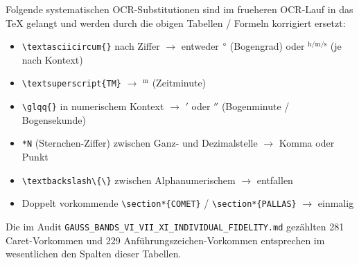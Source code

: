 \documentclass[11pt,a4paper]{article}
\begin{document}
Folgende systematischen OCR-Substitutionen sind im frueheren OCR-Lauf in das TeX gelangt
und werden durch die obigen Tabellen / Formeln korrigiert ersetzt:
\begin{itemize}\itemsep0pt
\item \verb|\textasciicircum{}| nach Ziffer $\to$ entweder $\degree$ (Bogengrad) oder $^{\mathrm{h/m/s}}$ (je nach Kontext)
\item \verb|\textsuperscript{TM}|              $\to$ $^{\mathrm{m}}$ (Zeitminute)
\item \verb|\glqq{}| in numerischem Kontext    $\to$ $'$ oder $''$ (Bogenminute / Bogensekunde)
\item \verb|*N| (Sternchen-Ziffer) zwischen Ganz- und Dezimalstelle $\to$ Komma oder Punkt
\item \verb|\textbackslash\{\}| zwischen Alphanumerischem $\to$ entfallen
\item Doppelt vorkommende \verb|\section*{COMET}| / \verb|\section*{PALLAS}| $\to$ einmalig
\end{itemize}

\noindent
Die im Audit \texttt{GAUSS\_BANDS\_VI\_VII\_XI\_INDIVIDUAL\_FIDELITY.md} gez\"ahlten
281 Caret-Vorkommen und 229 Anf\"uhrungszeichen-Vorkommen entsprechen im wesentlichen
den Spalten dieser Tabellen.
\end{document}
